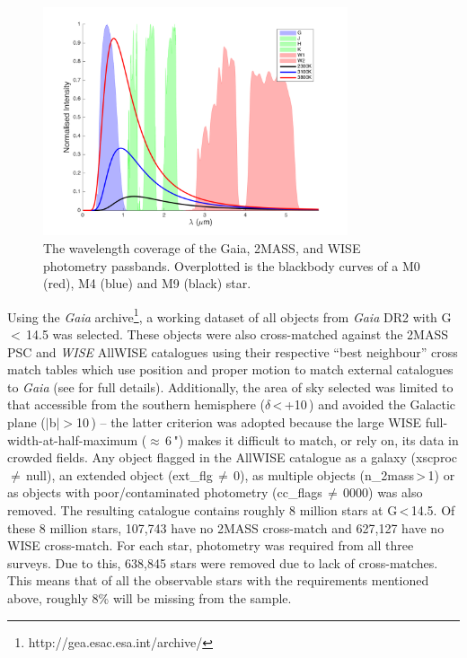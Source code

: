 \begin{figure}
    \centering
    \includegraphics[width=0.8\textwidth]{Passbands.png}
    \caption{The wavelength coverage of the Gaia, 2MASS, and WISE photometry passbands. Overplotted is the blackbody curves of a M0 (red), M4 (blue) and M9 (black) star.}
    \label{figPassband}
\end{figure}

Using the {\em Gaia} archive\footnote{http://gea.esac.esa.int/archive/}, a working dataset of all objects from {\em Gaia} DR2 \citep{2018GaiaDR2} with G\,$<$\,14.5 was selected. These objects were also cross-matched against the 2MASS PSC and {\em WISE} AllWISE catalogues using their respective ``best neighbour'' cross match tables which use position and proper motion to match external catalogues to {\em Gaia} (see \citealt{2017Marrese} for full details). Additionally, the area of sky selected was limited to that accessible from the southern hemisphere ($\delta$\,\textless\,+10\,\degree) and avoided the Galactic plane ($|$b$|>$10\,\degree) -- the latter criterion was adopted because the large WISE full-width-at-half-maximum ($\approx$\,6\,") makes it difficult to match, or rely on, its data in crowded fields. Any object flagged in the AllWISE catalogue as a galaxy (xscproc\,$\neq$\,null), an extended object (ext\_flg\,$\neq$\,0), as multiple objects (n\_2mass\,\textgreater\,1) or as objects with poor/contaminated photometry (cc\_flags\,$\neq$\,0000) was also removed. The resulting catalogue contains roughly 8 million stars at G\,\textless\,14.5. Of these 8 million stars, 107,743 have no 2MASS cross-match and 627,127 have no WISE cross-match. For each star, photometry was required from all three surveys. Due to this, 638,845 stars were removed due to lack of cross-matches. This means that of all the observable stars with the requirements mentioned above, roughly 8\% will be missing from the sample.

